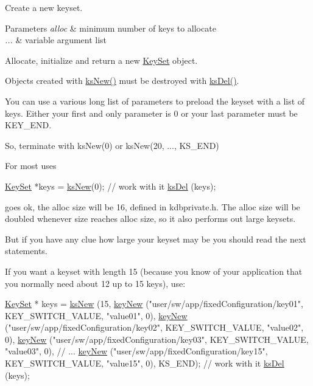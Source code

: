 Create a new keyset. 


\begin{DoxyParams}{Parameters}
{\em alloc} & minimum number of keys to allocate \\
\hline
{\em ...} & variable argument list\\
\hline
\end{DoxyParams}
Allocate, initialize and return a new \hyperlink{classkdb_1_1KeySet}{Key\-Set} object.

Objects created with \hyperlink{group__keyset_ga671e1aaee3ae9dc13b4834a4ddbd2c3c}{ks\-New()} must be destroyed with \hyperlink{group__keyset_ga27e5c16473b02a422238c8d970db7ac8}{ks\-Del()}.

You can use a various long list of parameters to preload the keyset with a list of keys. Either your first and only parameter is 0 or your last parameter must be K\-E\-Y\-\_\-\-E\-N\-D.

So, terminate with ks\-New(0) or ks\-New(20, ..., K\-S\-\_\-\-E\-N\-D)

For most uses 
\begin{DoxyCode}
\hyperlink{classkdb_1_1KeySet_a4eac9850fa4f06c07a5306befc3e4377}{KeySet} *keys = \hyperlink{group__keyset_ga671e1aaee3ae9dc13b4834a4ddbd2c3c}{ksNew}(0);
\textcolor{comment}{// work with it}
\hyperlink{group__keyset_ga27e5c16473b02a422238c8d970db7ac8}{ksDel} (keys);
\end{DoxyCode}
 goes ok, the alloc size will be 16, defined in kdbprivate.\-h. The alloc size will be doubled whenever size reaches alloc size, so it also performs out large keysets.

But if you have any clue how large your keyset may be you should read the next statements.

If you want a keyset with length 15 (because you know of your application that you normally need about 12 up to 15 keys), use\-: 
\begin{DoxyCode}
\hyperlink{classkdb_1_1KeySet_a4eac9850fa4f06c07a5306befc3e4377}{KeySet} * keys = \hyperlink{group__keyset_ga671e1aaee3ae9dc13b4834a4ddbd2c3c}{ksNew} (15,
        \hyperlink{group__key_gaf6893c038b3ebee90c73a9ea8356bebf}{keyNew} (\textcolor{stringliteral}{"user/sw/app/fixedConfiguration/key01"}, KEY\_SWITCH\_VALUE,
       \textcolor{stringliteral}{"value01"}, 0),
        \hyperlink{group__key_gaf6893c038b3ebee90c73a9ea8356bebf}{keyNew} (\textcolor{stringliteral}{"user/sw/app/fixedConfiguration/key02"}, KEY\_SWITCH\_VALUE,
       \textcolor{stringliteral}{"value02"}, 0),
        \hyperlink{group__key_gaf6893c038b3ebee90c73a9ea8356bebf}{keyNew} (\textcolor{stringliteral}{"user/sw/app/fixedConfiguration/key03"}, KEY\_SWITCH\_VALUE,
       \textcolor{stringliteral}{"value03"}, 0),
        \textcolor{comment}{// ...}
        \hyperlink{group__key_gaf6893c038b3ebee90c73a9ea8356bebf}{keyNew} (\textcolor{stringliteral}{"user/sw/app/fixedConfiguration/key15"}, KEY\_SWITCH\_VALUE,
       \textcolor{stringliteral}{"value15"}, 0),
        KS\_END);
\textcolor{comment}{// work with it}
\hyperlink{group__keyset_ga27e5c16473b02a422238c8d970db7ac8}{ksDel} (keys);
\end{DoxyCode}


